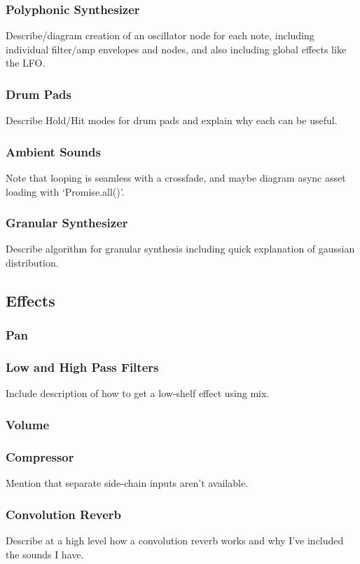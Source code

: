 \documentclass[11pt, a4paper]{article}
\begin{document}
\subsubsection{Polyphonic Synthesizer}
Describe/diagram creation of an oscillator node for each note, including individual filter/amp envelopes and nodes, and also including global effects like the LFO.
\subsubsection{Drum Pads}
Describe Hold/Hit modes for drum pads and explain why each can be useful.
\subsubsection{Ambient Sounds}
Note that looping is seamless with a crossfade, and maybe diagram async asset loading with `Promise.all()'.
\subsubsection{Granular Synthesizer}
Describe algorithm for granular synthesis including quick explanation of gaussian distribution.

\subsection{Effects}
\subsubsection{Pan}
\subsubsection{Low and High Pass Filters}
Include description of how to get a low-shelf effect using mix.
\subsubsection{Volume}
\subsubsection{Compressor}
Mention that separate side-chain inputs aren't available.
\subsubsection{Convolution Reverb}
Describe at a high level how a convolution reverb works and why I've included the sounds I have.
\end{document}
